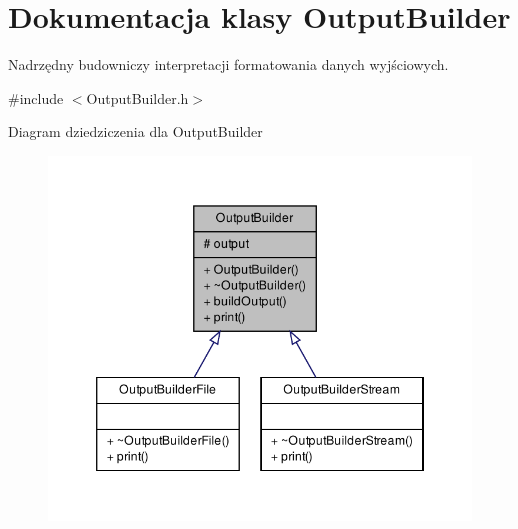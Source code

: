 \hypertarget{class_output_builder}{\section{\-Dokumentacja klasy \-Output\-Builder}
\label{class_output_builder}
}


\-Nadrzędny budowniczy interpretacji formatowania danych wyjściowych.  




{\ttfamily \#include $<$\-Output\-Builder.\-h$>$}



\-Diagram dziedziczenia dla \-Output\-Builder\nopagebreak
\begin{figure}[H]
\begin{center}
\leavevmode
\includegraphics[width=346pt]{class_output_builder__inherit__graph}
\end{center}
\end{figure}



